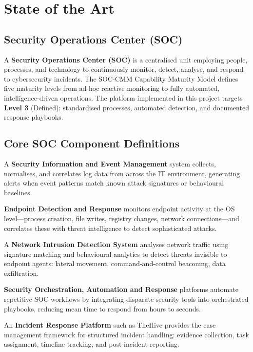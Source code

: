 \documentclass[12pt,a4paper]{report}
\begin{document}
\section{State of the Art}

\subsection{Security Operations Center (SOC)}

A \textbf{Security Operations Center (SOC)} is a centralised unit employing people, processes, and technology to continuously monitor, detect, analyse, and respond to cybersecurity incidents. The SOC-CMM Capability Maturity Model defines five maturity levels from ad-hoc reactive monitoring to fully automated, intelligence-driven operations. The platform implemented in this project targets \textbf{Level 3} (Defined): standardised processes, automated detection, and documented response playbooks.

\subsection{Core SOC Component Definitions}

\begin{description}[leftmargin=2cm, style=nextline]
  \item[SIEM] A \textbf{Security Information and Event Management} system collects, normalises, and correlates log data from across the IT environment, generating alerts when event patterns match known attack signatures or behavioural baselines.
  \item[EDR] \textbf{Endpoint Detection and Response} monitors endpoint activity at the OS level---process creation, file writes, registry changes, network connections---and correlates these with threat intelligence to detect sophisticated attacks.
  \item[NIDS] A \textbf{Network Intrusion Detection System} analyses network traffic using signature matching and behavioural analytics to detect threats invisible to endpoint agents: lateral movement, command-and-control beaconing, data exfiltration.
  \item[SOAR] \textbf{Security Orchestration, Automation and Response} platforms automate repetitive SOC workflows by integrating disparate security tools into orchestrated playbooks, reducing mean time to respond from hours to seconds.
  \item[IRP] An \textbf{Incident Response Platform} such as TheHive provides the case management framework for structured incident handling: evidence collection, task assignment, timeline tracking, and post-incident reporting.
\end{description}
\end{document}
